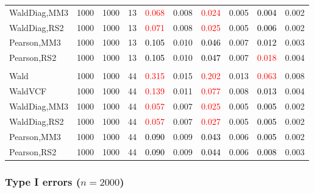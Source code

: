 \documentclass[
]{article}
\begin{document}
\begin{table}[H]
{\begin{tabular}[t]{lrrrrrrlrr}
\hspace{1em}WaldDiag,MM3 & 1000 & 1000 & 13 & \textcolor{red}{0.068} & 0.008 & \textcolor{red}{0.024} & 0.005 & \textcolor{black}{0.004} & 0.002\\
\hspace{1em}WaldDiag,RS2 & 1000 & 1000 & 13 & \textcolor{red}{0.071} & 0.008 & \textcolor{red}{0.025} & 0.005 & \textcolor{black}{0.006} & 0.002\\
\hspace{1em}Pearson,MM3 & 1000 & 1000 & 13 & \textcolor{black}{0.105} & 0.010 & \textcolor{black}{0.046} & 0.007 & \textcolor{black}{0.012} & 0.003\\
\hspace{1em}Pearson,RS2 & 1000 & 1000 & 13 & \textcolor{black}{0.105} & 0.010 & \textcolor{black}{0.047} & 0.007 & \textcolor{red}{0.018} & 0.004\\
\addlinespace[0.3em]
\multicolumn{10}{l}{\textbf{3F 15V}}\\
\hspace{1em}Wald & 1000 & 1000 & 44 & \textcolor{red}{0.315} & 0.015 & \textcolor{red}{0.202} & 0.013 & \textcolor{red}{0.063} & 0.008\\
\hspace{1em}WaldVCF & 1000 & 1000 & 44 & \textcolor{red}{0.139} & 0.011 & \textcolor{red}{0.077} & 0.008 & \textcolor{black}{0.013} & 0.004\\
\hspace{1em}WaldDiag,MM3 & 1000 & 1000 & 44 & \textcolor{red}{0.057} & 0.007 & \textcolor{red}{0.025} & 0.005 & \textcolor{black}{0.005} & 0.002\\
\hspace{1em}WaldDiag,RS2 & 1000 & 1000 & 44 & \textcolor{red}{0.057} & 0.007 & \textcolor{red}{0.027} & 0.005 & \textcolor{black}{0.005} & 0.002\\
\hspace{1em}Pearson,MM3 & 1000 & 1000 & 44 & \textcolor{black}{0.090} & 0.009 & \textcolor{black}{0.043} & 0.006 & \textcolor{black}{0.005} & 0.002\\
\hspace{1em}Pearson,RS2 & 1000 & 1000 & 44 & \textcolor{black}{0.090} & 0.009 & \textcolor{black}{0.044} & 0.006 & \textcolor{black}{0.008} & 0.003\\
\bottomrule
\end{tabular}}
\endgroup{}
\end{table}

\hypertarget{type-i-errors-n2000-2}{%
\subsubsection{\texorpdfstring{Type I errors
(\(n=2000\))}{Type I errors (n=2000)}}\label{type-i-errors-n2000-2}}
\end{document}
